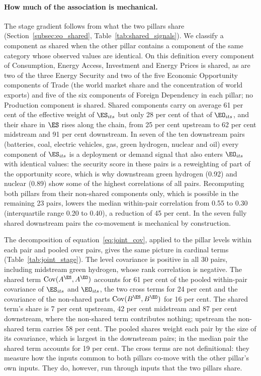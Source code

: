 \paragraph{How much of the association is mechanical.} The stage gradient follows from what the
two pillars share (Section~\ref{subsec:eo_shared}, Table~\ref{tab:shared_signals}). We classify a
component as shared when the other pillar contains a component of the same category whose
observed values are identical. On this definition every component of Consumption, Energy Access,
Investment and Energy Prices is shared, as are two of the three Energy Security and two of the
five Economic Opportunity components of Trade (the world market share and the concentration of
world exports) and five of the six components of Foreign Dependency in each pillar; no Production
component is shared. Shared components carry on average 61 per cent of the effective weight of
$\ES_{its}$ but only 28 per cent of that of $\EO_{its}$, and their share in $\ES$ rises along the
chain, from 25 per cent upstream to 62 per cent midstream and 91 per cent downstream. In seven of
the ten downstream pairs (batteries, coal, electric vehicles, gas, green hydrogen, nuclear and
oil) every component of $\ES_{its}$ is a deployment or demand signal that also enters
$\EO_{its}$ with identical values: the security score in these pairs is a reweighting of part of
the opportunity score, which is why downstream green hydrogen (0.92) and nuclear (0.89) show some
of the highest correlations of all pairs. Recomputing both pillars from their non-shared
components only, which is possible in the remaining 23 pairs, lowers the median within-pair
correlation from 0.55 to 0.30 (interquartile range 0.20 to 0.40), a reduction of 45 per cent. In
the seven fully shared downstream pairs the co-movement is mechanical by construction.

The decomposition of equation~\eqref{eq:joint_cov}, applied to the pillar levels within each pair
and pooled over pairs, gives the same picture in cardinal terms (Table~\ref{tab:joint_stage}).
The level covariance is positive in all 30 pairs, including midstream green hydrogen, whose rank
correlation is negative. The shared term $\operatorname{Cov}(A^{\ES},A^{\EO})$ accounts for 61
per cent of the pooled within-pair covariance of $\ES_{its}$ and $\EO_{its}$, the two cross terms
for 24 per cent and the covariance of the non-shared parts $\operatorname{Cov}(B^{\ES},B^{\EO})$
for 16 per cent. The shared term's share is 7 per cent upstream, 42 per cent midstream and 87 per
cent downstream, where the non-shared term contributes nothing; upstream the non-shared term
carries 58 per cent. The pooled shares weight each pair by the size of its covariance, which is
largest in the downstream pairs; in the median pair the shared term accounts for 19 per cent. The
cross terms are not definitional: they measure how the inputs common to both pillars co-move with
the other pillar's own inputs. They do, however, run through inputs that the two pillars share.

